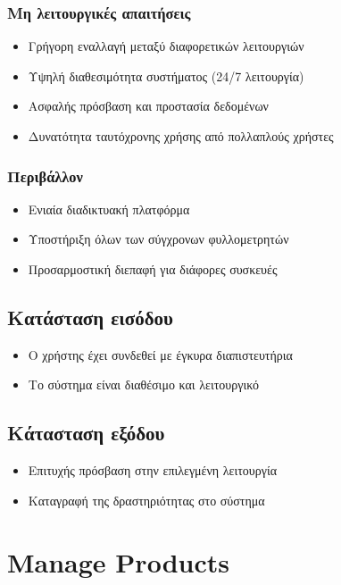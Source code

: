 \documentclass[12pt,a4paper,twoside]{book}
\begin{document}
\subsubsection{Μη λειτουργικές απαιτήσεις}
\begin{itemize}
  \item Γρήγορη εναλλαγή μεταξύ διαφορετικών λειτουργιών %
  \item Υψηλή διαθεσιμότητα συστήματος (24/7 λειτουργία) %
  \item Ασφαλής πρόσβαση και προστασία δεδομένων %
  \item Δυνατότητα ταυτόχρονης χρήσης από πολλαπλούς χρήστες
\end{itemize}

\subsubsection{Περιβάλλον}
\begin{itemize}
  \item Ενιαία διαδικτυακή πλατφόρμα %
  \item Υποστήριξη όλων των σύγχρονων φυλλομετρητών
  \item Προσαρμοστική διεπαφή για διάφορες συσκευές %
\end{itemize}

\subsection{Κατάσταση εισόδου} %
\begin{itemize}
  \item Ο χρήστης έχει συνδεθεί με έγκυρα διαπιστευτήρια %
  \item Το σύστημα είναι διαθέσιμο και λειτουργικό %
\end{itemize}

\subsection{Κάτασταση εξόδου} %
\begin{itemize}
  \item Επιτυχής πρόσβαση στην επιλεγμένη λειτουργία
  \item Καταγραφή της δραστηριότητας στο σύστημα %
\end{itemize}

\section{Manage Products}
\end{document}
